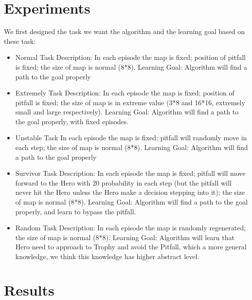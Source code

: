 \documentclass[article]{aaltoseries}
\begin{document}


\section{Experiments}

We first designed the task we want the algorithm and the learning goal based on these task: 
\begin{itemize}
\item Normal Task
Description: In each episode the map is fixed; position of pitfall is fixed; the size of map is normal (8*8).
Learning Goal:  Algorithm will find a path to the goal properly

\item Extremely Task
Description: In each episode the map is fixed; position of pitfall is fixed; the size of map is in extreme value (3*8 and 16*16, extremely small and large respectively).
Learning Goal: Algorithm will find a path to the goal properly, with fixed episodes.

\item Unstable Task
In each episode the map is fixed; pitfall will randomly move in each step; the size of map is normal (8*8).
Learning Goal:  Algorithm will find a path to the goal properly

\item Survivor Task
Description: In each episode the map is fixed; pitfall will move forward to the Hero with 20\text{\%} probability in each step (but the pitfall will never hit the Hero unless the Hero make a decision stepping into it); the size of map is normal (8*8).
Learning Goal:  Algorithm will find a path to the goal properly, and learn to bypass the pitfall.

\item Random Task
Description: In each episode the map is randomly regenerated; the size of map is normal (8*8).
Learning Goal: Algorithm will learn that Hero need to approach to Trophy and avoid the Pitfall, which a more general knowledge, we think this knowledge has higher abstract level. 
\end{itemize}




\section{Results}
\end{document}
